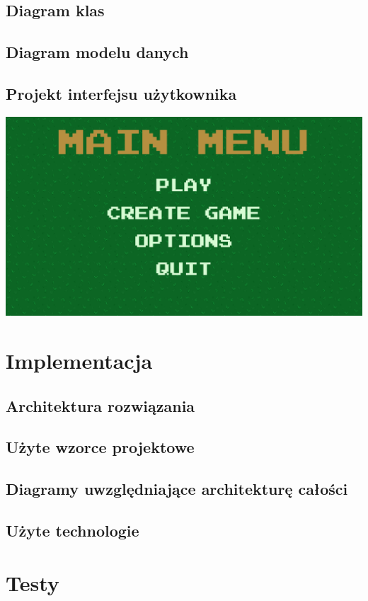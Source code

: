 \documentclass{article}
\begin{document}
\subsection{Diagram klas}
\subsection{Diagram modelu danych}
\subsection{Projekt interfejsu użytkownika}
\includegraphics[scale=0.5]{UIMainMenu.png}
\section{Implementacja}
\subsection{Architektura rozwiązania}
\subsection{Użyte wzorce projektowe}
\subsection{Diagramy uwzględniające architekturę całości}
\subsection{Użyte technologie}
\section{Testy}
\end{document}
